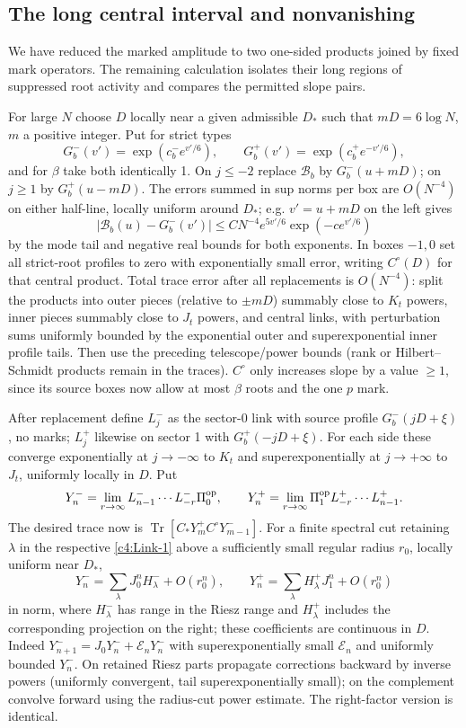 \subsection{The long central interval and nonvanishing}

We have reduced the marked amplitude to two one-sided products joined by fixed mark operators. The remaining calculation isolates their long regions of suppressed root activity and compares the permitted slope pairs.

For large \(N\) choose \(D\) locally near a given admissible \(D_*\) such that \(mD=6\log N\), \(m\) a positive integer. Put for strict types
\[
 G_b^-(v')=\exp(c_b^- e^{v'/6}),\qquad G_b^+(v')=\exp(c_b^+ e^{-v'/6}),
\]
and for \(\beta\) take both identically 1. On \(j\le-2\) replace \(\mathcal B_b\) by \(G_b^-(u+mD)\); on \(j\ge1\) by \(G_b^+(u-mD)\). The errors summed in sup norms per box are \(O(N^{-4})\) on either half-line, locally uniform around \(D_*\); e.g. \(v'=u+mD\) on the left gives
\[
 |\mathcal B_b(u)-G_b^-(v')|\le C N^{-4} e^{5v'/6}\exp(-c e^{v'/6})
\]
by the mode tail and negative real bounds for both exponents. In boxes \(-1,0\) set all strict-root profiles to zero with exponentially small error, writing \(C^\circ(D)\) for that central product. Total trace error after all replacements is \(O(N^{-4})\): split the products into outer pieces (relative to \(\pm mD\)) summably close to \(K_t\) powers, inner pieces summably close to \(J_t\) powers, and central links, with perturbation sums uniformly bounded by the exponential outer and superexponential inner profile tails. Then use the preceding telescope/power bounds (rank or Hilbert--Schmidt products remain in the traces). \(C^\circ\) only increases slope by a value \(\ge1\), since its source boxes now allow at most \(\beta\) roots and the one \(p\) mark.

After replacement define \(L_j^-\) as the sector-0 link with source profile \(G_b^-(jD+\xi)\), no marks; \(L_j^+\) likewise on sector 1 with \(G_b^+(-jD+\xi)\). For each side these converge exponentially at \(j\to-\infty\) to \(K_t\) and superexponentially at \(j\to+\infty\) to \(J_t\), uniformly locally in \(D\). Put
\[
 Y_n^-=\lim_{r\to\infty} L_{n-1}^-\cdots L_{-r}^-\Pi_0^{\rm op},
 \qquad Y_n^+=\lim_{r\to\infty}\Pi_1^{\rm op} L_{-r}^+\cdots L_{n-1}^+ .
\]
The desired trace now is \(\operatorname{Tr}[C_* Y_m^+ C^\circ Y_{m-1}^-]\).
For a finite spectral cut retaining \(\lambda\) in the respective \eqref{c4:Link-1} above a sufficiently small regular radius \(r_0\), locally uniform near \(D_*\),
\[
 Y_n^-=\sum_\lambda J_0^n H_\lambda^-+O(r_0^n),\qquad
 Y_n^+=\sum_\lambda H_\lambda^+ J_1^n+O(r_0^n)
\]
in norm, where \(H_\lambda^-\) has range in the Riesz range and \(H_\lambda^+\) includes the corresponding projection on the right; these coefficients are continuous in \(D\). Indeed \(Y_{n+1}^-=J_0Y_n^-+\mathcal E_n Y_n^-\) with superexponentially small \(\mathcal E_n\) and uniformly bounded \(Y_n^-\). On retained Riesz parts propagate corrections backward by inverse powers (uniformly convergent, tail superexponentially small); on the complement convolve forward using the radius-cut power estimate. The right-factor version is identical.

